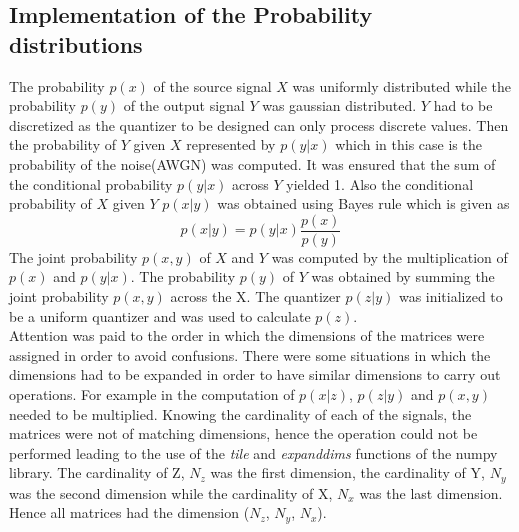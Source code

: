 \subsection{Implementation of the Probability distributions}
The probability $p(x)$ of the source signal  $X$ was uniformly distributed while the probability $p(y)$ of the output signal $Y$ was gaussian distributed. $Y$ had to be discretized as the quantizer to be designed can only process discrete values. Then the probability of $Y$ given $X$ represented by $p(y|x)$ which in this case is the probability of the noise(AWGN) was computed. It was ensured that the sum of the conditional probability $p(y|x)$ across $Y$ yielded 1. Also the conditional probability of $X$ given $Y$  $p(x|y)$ was obtained using Bayes rule which is given as
\begin{equation}
p(x|y) = p(y|x)  \frac{p(x)}{p(y)}
\end{equation}
The joint probability  $p(x, y)$ of $X$ and $Y$ was computed by the multiplication of $p(x)$ and $p(y|x)$. The probability $p(y)$ of $Y$ was obtained by summing the joint probability $p(x, y)$  across the X. The quantizer $p(z|y)$ was initialized to be a uniform quantizer and was used to calculate $p(z)$.\\
Attention was paid to the order in which the dimensions of the matrices were assigned in order to avoid confusions. There were some situations in which the dimensions had to be expanded in order to have similar dimensions to carry out operations. For example in the computation of $p(x|z)$, $p(z|y)$ and $p(x, y)$ needed to be multiplied. Knowing the cardinality of each of the signals, the matrices were not of matching dimensions, hence the operation could not be performed leading to the use of the \emph{tile} and \emph{expanddims} functions of the numpy library. The cardinality of Z, $N_z$ was the first dimension, the cardinality of Y, $N_y$ was the second dimension while the cardinality of X, $N_x$ was the last dimension. Hence all matrices had the dimension ($N_z$, $N_y$, $N_x$). 
